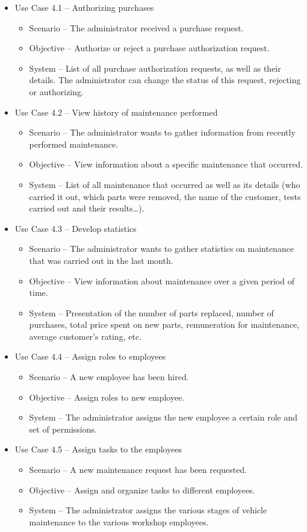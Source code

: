 \begin{itemize}
  \item Use Case 4.1 – Authorizing purchases
  \begin{itemize}
    \item Scenario –  The administrator received a purchase request.
    \item Objective – Authorize or reject a purchase authorization request.
    \item System – List of all purchase authorization requests, as well as their details. The administrator can change the status of this request, rejecting or authorizing. 
  \end{itemize}
  \item Use Case 4.2 – View history of maintenance performed
  \begin{itemize}
    \item Scenario – The administrator wants to gather information from recently performed maintenance.
    \item Objective – View information about a specific maintenance that occurred.
    \item System – List of all maintenance that occurred as well as its details (who carried it out, which parts were removed, the name of the customer, tests carried out and their results…). 
  \end{itemize}
  \item Use Case 4.3 – Develop statistics
  \begin{itemize}
    \item Scenario – The administrator wants to gather statistics on maintenance that was carried out in the last month.
    \item Objective – View information about maintenance over a given period of time.
    \item System – Presentation of the number of parts replaced, number of purchases, total price spent on new parts, remuneration for maintenance, average customer's rating, etc.
  \end{itemize}
  \item Use Case 4.4 – Assign roles to employees
  \begin{itemize}
    \item Scenario – A new employee has been hired.
    \item Objective –  Assign roles to new employee.
    \item System – The administrator assigns the new employee a certain role and set of permissions.
  \end{itemize}
  \item Use Case 4.5 – Assign tasks to the employees
  \begin{itemize}
    \item Scenario – A new maintenance request has been requested.
    \item Objective – Assign and organize tasks to different employees.
    \item System – The administrator assigns the various stages of vehicle maintenance to the various workshop employees.
  \end{itemize}
\end{itemize}
\hfill \break

